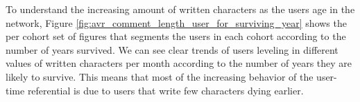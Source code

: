 
To understand the increasing amount of written characters as the users age in the network, Figure \ref{fig:avr_comment_length_user_for_surviving_year} shows the per cohort set of figures that segments the users in each cohort according to the number of years survived. We can see clear trends of users leveling in different values of written characters per month according to the number of years they are likely to survive. This means that most of the increasing behavior of the user-time referential is due to users that write few characters dying earlier.


